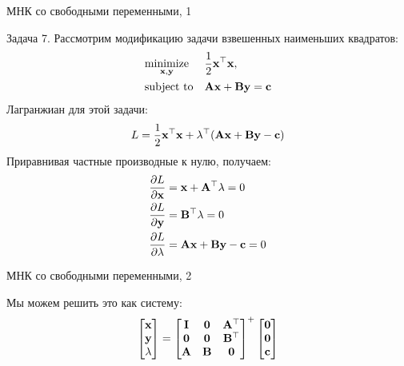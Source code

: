\documentclass{beamer}
\begin{document}
\begin{frame}{МНК со свободными переменными, 1}
	\begin{flushleft}
		
		Задача 7. Рассмотрим модификацию задачи взвешенных наименьших квадратов:
		\begin{equation}
			\begin{aligned}
				& \underset{\mathbf{x}, \mathbf{y}}{\text{minimize}}
				& & \frac{1}{2} \mathbf{x}^\top \mathbf{x}, \\
				& \text{subject to}
				& & \mathbf{A}\mathbf{x} + \mathbf{B}\mathbf{y}=\mathbf{c}
			\end{aligned}
		\end{equation}
		Лагранжиан для этой задачи:
		\begin{align}
			L = \frac{1}{2} \mathbf{x}^\top \mathbf{x} + \lambda^\top ( \mathbf{A}\mathbf{x} + \mathbf{B}\mathbf{y}-\mathbf{c})
		\end{align}
		Приравнивая частные производные к нулю, получаем:
		\begin{align}
			\frac{\partial L}{\partial \mathbf{x}} &=
			\mathbf{x} + \mathbf{A}^\top \lambda = 0 
			\\
			\frac{\partial L}{\partial \mathbf{y}} &=
			\mathbf{B}^\top \lambda = 0 
			\\
			\frac{\partial L}{\partial \lambda} &= \mathbf{A}\mathbf{x} + \mathbf{B}\mathbf{y}-\mathbf{c} = 0
		\end{align}		
		
		
	\end{flushleft}
\end{frame}



\begin{frame}{МНК со свободными переменными, 2}
	\begin{flushleft}
		
		
		Мы можем решить это как систему:
		\begin{align}
			\begin{bmatrix}
				\mathbf{x}\\ \mathbf{y} \\ \lambda
			\end{bmatrix}
			=
			\begin{bmatrix}
				\mathbf{I} & \mathbf{0} & \mathbf{A}^\top \\
				\mathbf{0} & \mathbf{0} & \mathbf{B}^\top \\
				\mathbf{A} & \mathbf{B} & \mathbf{0}
			\end{bmatrix}^+
			\begin{bmatrix}
				\mathbf{0}\\ \mathbf{0} \\ \mathbf{c} 
			\end{bmatrix}
		\end{align}		
		
		
		
	\end{flushleft}
\end{frame}
\end{document}
